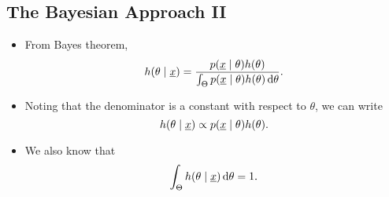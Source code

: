 \subsection*{The Bayesian Approach II}
\begin{itemize}
      \item From Bayes theorem,
            \[ h(\theta\mid \Vector{x})=\frac{p(\Vector{x}\mid \theta)h(\theta)}{\int_{\Theta}p(\Vector{x}\mid \theta)h(\theta)\odif{\theta}}. \]
      \item Noting that the denominator is a constant with respect to $ \theta $, we can write
            \[ h(\theta\mid \underline{x})\propto p(\underline{x}\mid \theta)h(\theta). \]
      \item We also know that
            \[ \int_{\Theta}h(\theta\mid \Vector{x})\odif{\theta}=1. \]
\end{itemize}
